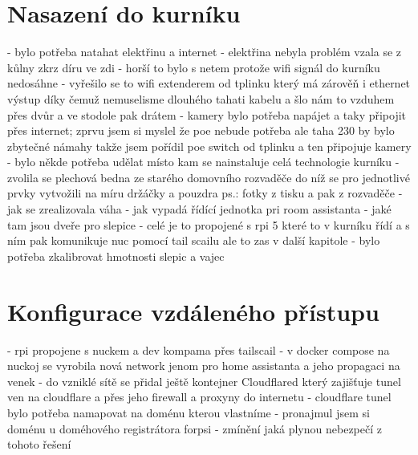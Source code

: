 \section{Nasazení do kurníku}\label{sec:nasazeni-do-kurniku}
- bylo potřeba natahat elektřinu a internet \newline
- elektřina nebyla problém vzala se z kůlny zkrz díru ve zdi\newline
- horší to bylo s netem protože wifi signál do kurníku nedosáhne\newline
- vyřešilo se to wifi extenderem od tplinku který má zárověň i ethernet výstup díky čemuž nemuselisme dlouhého tahati kabelu a šlo nám to vzduhem přes dvůr a ve stodole pak drátem\newline
- kamery bylo potřeba napájet a taky připojit přes internet; zprvu jsem si myslel že poe nebude potřeba ale taha 230 by bylo zbytečné námahy takže jsem pořídil poe switch od tplinku a ten připojuje kamery\newline
- bylo někde potřeba udělat místo kam se nainstaluje celá technologie kurníku\newline
- zvolila se plechová bedna ze starého domovního rozvaděče do níž se pro jednotlivé prvky vytvožili na míru držáčky a pouzdra ps.: fotky z tisku a pak z rozvaděče\newline
- jak se zrealizovala váha\newline
- jak vypadá řídící jednotka pri room assistanta\newline
- jaké tam jsou dveře pro slepice\newline
- celé je to propojené s rpi 5 které to v kurníku řídí a s ním pak komunikuje nuc pomocí tail scailu ale to zas v další kapitole\newline
- bylo potřeba zkalibrovat hmotnosti slepic a vajec


\section{Konfigurace vzdáleného přístupu}\label{sec:konfigurace-vzdaleneho-pristupu}
- rpi propojene s nuckem a dev kompama přes tailscail\newline
- v docker compose na nuckoj se vyrobila nová network jenom pro home assistanta a jeho propagaci na venek\newline
- do vzniklé sítě se přidal ještě kontejner Cloudflared který zajišťuje tunel ven na cloudflare a přes jeho firewall a proxyny do internetu\newline
- cloudflare tunel bylo potřeba namapovat na doménu kterou vlastníme\newline
- pronajmul jsem si doménu u doméhového registrátora forpsi\newline
- zmínění jaká plynou nebezpečí z tohoto řešení


